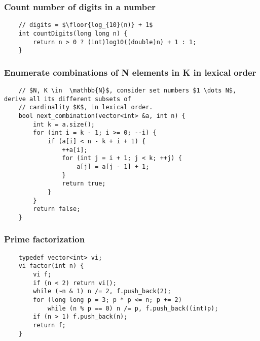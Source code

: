 \documentclass{article}
\begin{document}
\subsubsection{Count number of digits in a number}
\begin{verbatim}
    // digits = $\floor{log_{10}(n)} + 1$
    int countDigits(long long n) {
        return n > 0 ? (int)log10((double)n) + 1 : 1;
    }
\end{verbatim}

\subsubsection{Enumerate combinations of N elements in K in lexical order}
\begin{verbatim}
    // $N, K \in  \mathbb{N}$, consider set numbers $1 \dots N$, derive all its different subsets of 
    // cardinality $K$, in lexical order.
    bool next_combination(vector<int> &a, int n) {
        int k = a.size();
        for (int i = k - 1; i >= 0; --i) {
            if (a[i] < n - k + i + 1) {
                ++a[i];
                for (int j = i + 1; j < k; ++j) {
                    a[j] = a[j - 1] + 1;
                }
                return true;
            }
        }
        return false;
    }
\end{verbatim}

\subsubsection{Prime factorization}
\begin{verbatim}
    typedef vector<int> vi;
    vi factor(int n) {
        vi f;
        if (n < 2) return vi();
        while (~n & 1) n /= 2, f.push_back(2);
        for (long long p = 3; p * p <= n; p += 2) 
            while (n % p == 0) n /= p, f.push_back((int)p);
        if (n > 1) f.push_back(n);
        return f;
    }
\end{verbatim}
\end{document}
